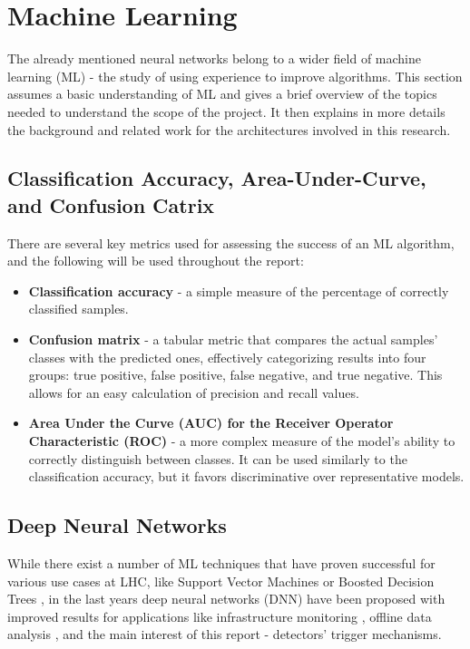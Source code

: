 \section{Machine Learning}
The already mentioned neural networks belong to a wider field of machine learning (ML) - the study of using experience to improve algorithms. This section assumes a basic understanding of ML and gives a brief overview of the topics needed to understand the scope of the project. It then explains in more details the background and related work for the architectures involved in this research.


\subsection{Classification Accuracy, Area-Under-Curve, and Confusion Catrix} \label{ml-accuracy-auc-confusion}
There are several key metrics used for assessing the success of an ML algorithm, and the following will be used throughout the report:

\begin{itemize}
  \item \textbf{Classification accuracy} - a simple measure of the percentage of correctly classified samples.
  \item \textbf{Confusion matrix} - a tabular metric that compares the actual samples' classes with the predicted ones, effectively categorizing results into four groups: true positive, false positive, false negative, and true negative. This allows for an easy calculation of precision and recall values.
  \item \textbf{Area Under the Curve (AUC) for the Receiver Operator Characteristic (ROC)} - a more complex measure of the model's ability to correctly distinguish between classes. It can be used similarly to the classification accuracy, but it favors discriminative over representative models.
\end{itemize}


\subsection{Deep Neural Networks}
While there exist a number of ML techniques that have proven successful for various use cases at LHC, like Support Vector Machines \cite{38-valentino2012classification} or Boosted Decision Trees \cite{pmlr-v42-chen14}, in the last years deep neural networks (DNN) have been proposed with improved results for applications like infrastructure monitoring \cite{39-skoczen2016lstm}, offline data analysis \cite{40-ren2020unveiling}, and the main interest of this report - detectors' trigger mechanisms.

